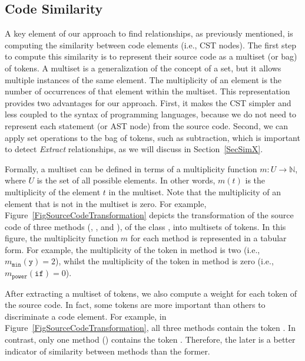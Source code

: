 \subsection{Code Similarity}
\label{SecCodeSim}



A key element of our approach to find relationships, as previously mentioned, is computing the similarity between code elements (i.e., CST nodes).
The first step to compute this similarity is to represent their source code as a multiset (or bag) of tokens.
A multiset is a generalization of the concept of a set, but it allows multiple instances of the same element.
The multiplicity of an element is the number of occurrences of that element within the multiset.
This representation provides two advantages for our approach.
First, it makes the CST simpler and less coupled to the syntax of programming languages, because we do not need to represent each statement (or AST node) from the source code. Second, we can apply set operations to the bag of tokens, such as subtraction, which is important to detect \emph{Extract} relationships, as we will discuss in Section~\ref{SecSimX}.

Formally, a multiset can be defined in terms of a multiplicity function $m: U \to \mathbb{N}$, where $U$ is the set of all possible elements. In other words, $m(t)$ is the multiplicity of the element $t$ in the multiset. Note that the multiplicity of an element that is not in the multiset is zero.
For example, Figure~\ref{FigSourceCodeTransformation} depicts the transformation of the source code of three methods (, , and ), of the class , into multisets of tokens. In this figure, the multiplicity function $m$ for each method is represented in a tabular form. For example, the multiplicity of the token  in method  is two (i.e., $m_{\mathtt{min}}(\mathtt{y}) = 2$), whilst the multiplicity of the token  in method  is zero (i.e., $m_{\mathtt{power}}(\mathtt{if}) = 0$).

After extracting a multiset of tokens, we also compute a weight for each token
of the source code.
In fact, some tokens are more important than others to discriminate a code element.
For example, in Figure~\ref{FigSourceCodeTransformation}, all three methods contain the token . In contrast, only one method () contains the token . Therefore, the later is a better indicator of similarity between methods than the former.

